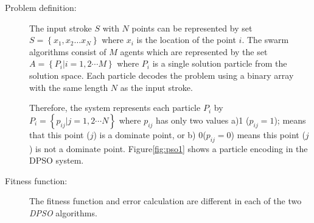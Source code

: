 \documentclass[10pt]{article}
\begin{document}
\begin{description}
	\item[ Problem definition:] The input stroke $S$  with $N$ points can be represented by set $S = \left\{ {x_1 ,x_2  \ldots x_N }\right\}$ where $x_i$ is the location of the point $i$. The swarm algorithms consist of $M$ agents which are represented by the set $A = \left\{ {P_i \left| {i = 1,2 \cdots M} \right.} \right\}$ where $P_i$ is a single solution particle from the solution space. Each particle decodes the problem using a binary array with the same length $N$ as the input stroke.  

Therefore, the system represents each particle $P_i$ by $P_i = \left\{ {p_{ij} \left| {j = 1,2 \cdots N} \right.} \right\}$ where $p_{ij}$ has only two values a)1 ($p_{ij}=1$); means that this point ($j$) is a dominate point, or b) 0($p_{ij}=0$) means this point ($j$) is not a dominate point. Figure\ref{fig:pso1} shows a particle encoding in the DPSO system. 

	\item[Fitness function:] The fitness function and error calculation are different in each of the two \textit{DPSO} algorithms. 
	\end{description}
\end{document}
